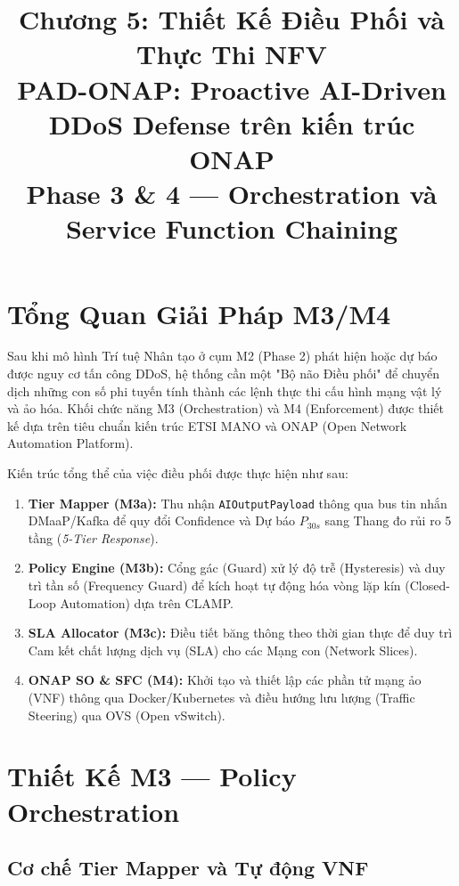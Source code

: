 \documentclass[12pt,a4paper]{article}
\title{\textbf{Chương 5: Thiết Kế Điều Phối và Thực Thi NFV}\\[0.4em]
\large PAD-ONAP: Proactive AI-Driven DDoS Defense trên kiến trúc ONAP\\[0.3em]
\normalsize Phase 3 \& 4 --- Orchestration và Service Function Chaining}
\author{}
\date{}
\begin{document}
\maketitle
\tableofcontents
\newpage

\section{Tổng Quan Giải Pháp M3/M4}

Sau khi mô hình Trí tuệ Nhân tạo ở cụm M2 (Phase 2) phát hiện hoặc dự báo được nguy cơ tấn công DDoS, hệ thống cần một "Bộ não Điều phối" để chuyển dịch những con số phi tuyến tính thành các lệnh thực thi cấu hình mạng vật lý và ảo hóa. Khối chức năng M3 (Orchestration) và M4 (Enforcement) được thiết kế dựa trên tiêu chuẩn kiến trúc ETSI MANO và ONAP (Open Network Automation Platform).

Kiến trúc tổng thể của việc điều phối được thực hiện như sau:
\begin{enumerate}[leftmargin=2em]
\item \textbf{Tier Mapper (M3a):} Thu nhận \texttt{AIOutputPayload} thông qua bus tin nhắn DMaaP/Kafka để quy đổi Confidence và Dự báo $P_{30s}$ sang Thang đo rủi ro 5 tầng (\textit{5-Tier Response}).
\item \textbf{Policy Engine (M3b):} Cổng gác (Guard) xử lý độ trễ (Hysteresis) và duy trì tần số (Frequency Guard) để kích hoạt tự động hóa vòng lặp kín (Closed-Loop Automation) dựa trên CLAMP.
\item \textbf{SLA Allocator (M3c):} Điều tiết băng thông theo thời gian thực để duy trì Cam kết chất lượng dịch vụ (SLA) cho các Mạng con (Network Slices).
\item \textbf{ONAP SO \& SFC (M4):} Khởi tạo và thiết lập các phần tử mạng ảo (VNF) thông qua Docker/Kubernetes và điều hướng lưu lượng (Traffic Steering) qua OVS (Open vSwitch).
\end{enumerate}

\section{Thiết Kế M3 --- Policy Orchestration}

\subsection{Cơ chế Tier Mapper và Tự động VNF}
\end{document}

